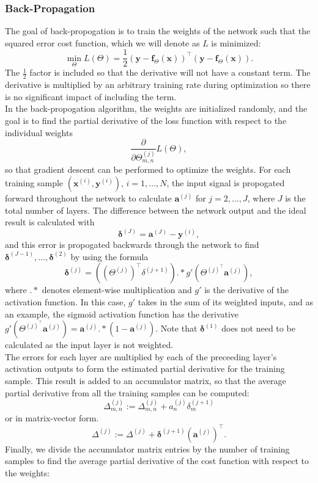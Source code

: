 \documentclass[a4paper,12pt]{article}
\begin{document}
\subsubsection{Back-Propagation}
The goal of back-propogation is to train the weights of the network such that the squared error cost function, which we will denote as $L$ is minimized:
\[\min_\Theta L(\Theta)=\frac12 (\bm{y}-\bm{f}_\Theta(\bm{x}))^\top(\bm{y}-\bm{f}_\Theta(\bm{x})).\]
The $\frac12$ factor is included so that the derivative will not have a constant term. The derivative is multiplied by an arbitrary training rate during optimization so there is no significant impact of including the term.\\
In the back-propogation algorithm, the weights are initialized randomly, and the goal is to find the partial derivative of the loss function with respect to the individual weights \[\frac{\partial}{\partial\Theta_{m,n}^{(j)}}L(\Theta),\]
so that gradient descent can be performed to optimize the weights. For each training sample $(\bm{x}^{(i)},\bm{y}^{(i)})$, $i=1,\dots,N$, the input signal is propogated forward throughout the network to calculate $\bm{a}^{(j)}$ for $j=2,\dots,J$, where $J$ is the total number of layers. The difference between the network output and the ideal result is calculated with 
\[\bm{\delta}^{(J)}=\bm{a}^{(J)}-\bm{y}^{(i)},\] 
and this error is propogated backwards through the network to find $\bm{\delta}^{(J-1)},\dots,\bm{\delta}^{(2)}$ by using the formula 
\[\bm{\delta}^{(j)}=((\Theta^{(j)})^\top \delta^{(j+1)}).*g'(\Theta^{(j)^\top} \bm{a}^{(j)}),\] 
where $.*$ denotes element-wise multiplication and $g'$ is the derivative of the activation function. In this case, $g'$ takes in the sum of its weighted inputs, and as an example, the sigmoid activation function has the derivative $g'(\Theta^{(j)^\top} \bm{a}^{(j)})=\bm{a}^{(j)}.*(1-\bm{a}^{(j)})$. Note that $\bm{\delta}^{(1)}$ does not need to be calculated as the input layer is not weighted. \\
The errors for each layer are multiplied by each of the preceeding layer's activation outputs to form the estimated partial derivative for the training sample. This result is added to an accumulator matrix, so that the average partial derivative from all the training samples can be computed:
\[\Delta^{(j)}_{m,n}:=\Delta^{(j)}_{m,n}+a_n^{(j)}\delta_m^{(j+1)}\]
or in matrix-vector form.
\[\Delta^{(j)}:=\Delta^{(j)}+\bm{\delta}^{(j+1)}(\bm{a}^{(j)})^\top.\]
Finally, we divide the accumulator matrix entries by the number of training samples to find the average partial derivative of the cost function with respect to the weights:
\end{document}
